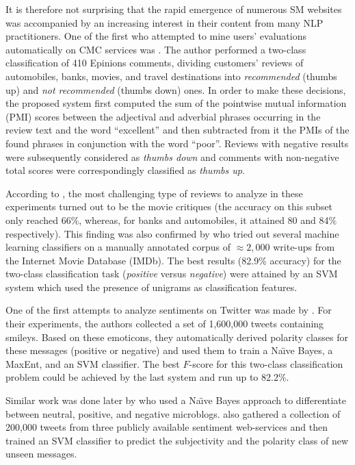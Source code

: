It is therefore not surprising that the rapid emergence of numerous SM
websites was accompanied by an increasing interest in their content
from many NLP practitioners.  One of the first who attempted to mine
users' evaluations automatically on CMC services was
\citet{Turney:02}.  The author performed a two-class classification of
410 Epinions comments, dividing customers' reviews of automobiles,
banks, movies, and travel destinations into \emph{recommended} (thumbs
up) and \emph{not recommended} (thumbs down) ones.  In order to make
these decisions, the proposed system first computed the sum of the
pointwise mutual information (PMI) scores between the adjectival and
adverbial phrases occurring in the review text and the word
``excellent'' and then subtracted from it the PMIs of the found
phrases in conjunction with the word ``poor''.  Reviews with negative
results were subsequently considered as \emph{thumbs down} and
comments with non-negative total scores were correspondingly
classified as \emph{thumbs up}.

According to \citet{Turney:02}, the most challenging type of reviews
to analyze in these experiments turned out to be the movie critiques
(the accuracy on this subset only reached 66\%, whereas, for banks and
automobiles, it attained 80 and 84\% respectively).  This finding was
also confirmed by \citet{Pang:02} who tried out several machine
learning classifiers on a manually annotated corpus of $\approx2,000$
write-ups from the Internet Movie Database (IMDb).  The best results
(82.9\% accuracy) for the two-class classification task
(\emph{positive} versus \emph{negative}) were attained by an SVM
system which used the presence of unigrams as classification features.

One of the first attempts to analyze sentiments on Twitter was made by
\citet{Go:09}.  For their experiments, the authors collected a set of
1,600,000 tweets containing smileys.  Based on these emoticons, they
automatically derived polarity classes for these messages (positive or
negative) and used them to train a Na\"{\i}ve Bayes, a MaxEnt, and an
SVM classifier.  The best $F$-score for this two-class classification
problem could be achieved by the last system and run up to 82.2\%.

Similar work was done later by \citet{Pak:10} who used a Na\"{\i}ve
Bayes approach to differentiate between neutral, positive, and
negative microblogs. \citet{Barbosa:10} also gathered a collection of
200,000 tweets from three publicly available sentiment web-services
and then trained an SVM classifier to predict the subjectivity and the
polarity class of new unseen messages.

